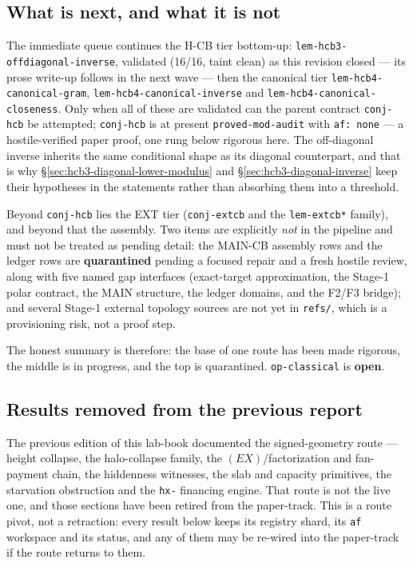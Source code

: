 \subsection*{What is next, and what it is not}

The immediate queue continues the H-CB tier bottom-up:
\texttt{lem-hcb3-offdiagonal-inverse}, validated (16/16, taint clean) as this revision
closed --- its prose write-up follows in the next wave --- then the canonical tier \texttt{lem-hcb4-canonical-gram}, \texttt{lem-hcb4-canonical-inverse}
and \texttt{lem-hcb4-canonical-closeness}. Only when all of these are validated can the
parent contract \texttt{conj-hcb} be attempted; \texttt{conj-hcb} is at present
\texttt{proved-mod-audit} with \texttt{af: none} --- a hostile-verified paper proof, one
rung below rigorous here. The off-diagonal inverse inherits the same conditional shape as
its diagonal counterpart, and that is why \S\ref{sec:hcb3-diagonal-lower-modulus} and
\S\ref{sec:hcb3-diagonal-inverse} keep their hypotheses in the statements rather than
absorbing them into a threshold.

Beyond \texttt{conj-hcb} lies the EXT tier (\texttt{conj-extcb} and the
\texttt{lem-extcb*} family), and beyond that the assembly. Two items are explicitly
\emph{not} in the pipeline and must not be treated as pending detail: the MAIN-CB
assembly rows and the ledger rows are \textbf{quarantined} pending a focused repair and a
fresh hostile review, along with five named gap interfaces (exact-target approximation,
the Stage-1 polar contract, the MAIN structure, the ledger domains, and the F2/F3
bridge); and several Stage-1 external topology sources are not yet in \texttt{refs/},
which is a provisioning risk, not a proof step.

The honest summary is therefore: the base of one route has been made rigorous, the middle
is in progress, and the top is quarantined. \texttt{op-classical} is \textbf{open}.

\subsection*{Results removed from the previous report}

The previous edition of this lab-book documented the signed-geometry route --- height
collapse, the halo-collapse family, the $(EX)$/factorization and fan-payment chain, the
hiddenness witnesses, the slab and capacity primitives, the starvation obstruction and
the \texttt{hx-} financing engine. That route is not the live one, and those sections have
been retired from the paper-track. This is a route pivot, not a retraction: every result
below keeps its registry shard, its \texttt{af} workspace and its status, and any of them
may be re-wired into the paper-track if the route returns to them.

